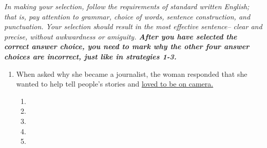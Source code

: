 \documentclass[12pt]{book}
\begin{document}
\begin{enumerate}
\textit{In making your selection, follow the requirements of standard written English; that is, pay attention to grammar, choice of words, sentence construction, and punctuation. Your selection should result in the most effective sentence-- clear and precise, without awkwardness or amiguity. \textbf{After you have selected the correct answer choice, you need to mark why the other four answer choices are incorrect, just like in strategies 1-3.}}

\begin{enumerate}
\item When asked why she became a journalist, the woman responded that she wanted to help tell people’s stories and \ul{ loved to be on camera.}

\bigskip
\begin{enumerate}[label=(\Alph*)]
\item    \hrulefill
\item    \hrulefill
\item   \hrulefill
\item   \hrulefill
\item   \hrulefill
\end{enumerate}

\end{enumerate}

\end{enumerate}
\end{document}
